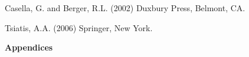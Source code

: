 \documentclass[11pt]{ncsuthesis3}
\begin{document}






%













\begin{thebibliography}{99}
\setlength{\baselineskip}{0.1in}
Casella, G. and Berger, R.L. (2002)
Duxbury Press, Belmont, CA.

Tsiatis, A.A. (2006)
Springer, New York.

\end{thebibliography}


\newpage

\vspace{0.2in}


\appendix
\addappheadtotoc

\begin{center}
{\Huge{\bf Appendices}}
\end{center}


\end{document}
